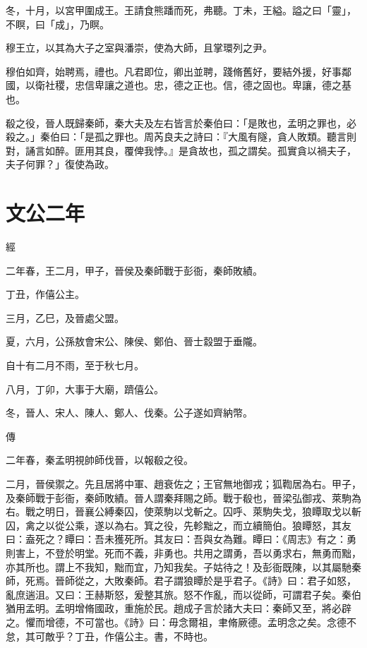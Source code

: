 \documentclass[fontset = none]{ctexart}
\begin{document}
冬，十月，以宮甲圍成王。王請食熊蹯而死，弗聽。丁未，王縊。謚之曰「靈」，不瞑，曰「成」，乃瞑。

穆王立，以其為大子之室與潘崇，使為大師，且掌環列之尹。

穆伯如齊，始聘焉，禮也。凡君即位，卿出並聘，踐脩舊好，要結外援，好事鄰國，以衛社稷，忠信卑讓之道也。忠，德之正也。信，德之固也。卑讓，德之基也。

殽之役，晉人既歸秦師，秦大夫及左右皆言於秦伯曰：「是敗也，孟明之罪也，必殺之。」秦伯曰：「是孤之罪也。周芮良夫之詩曰：『大風有隧，貪人敗類。聽言則對，誦言如醉。匪用其良，覆俾我悖。』是貪故也，孤之謂矣。孤實貪以禍夫子，夫子何罪？」復使為政。





\section{文公二年}


經



二年春，王二月，甲子，晉侯及秦師戰于彭衙，秦師敗績。

丁丑，作僖公主。

三月，乙巳，及晉處父盟。

夏，六月，公孫敖會宋公、陳侯、鄭伯、晉士縠盟于垂隴。

自十有二月不雨，至于秋七月。

八月，丁卯，大事于大廟，躋僖公。

冬，晉人、宋人、陳人、鄭人、伐秦。公子遂如齊納幣。

傳



二年春，秦孟明視帥師伐晉，以報殽之役。

二月，晉侯禦之。先且居將中軍、趙衰佐之；王官無地御戎；狐鞫居為右。甲子，及秦師戰于彭衙，秦師敗績。晉人謂秦拜賜之師。戰于殽也，晉梁弘御戎、萊駒為右。戰之明日，晉襄公縛秦囚，使萊駒以戈斬之。囚呼、萊駒失戈，狼瞫取戈以斬囚，禽之以從公乘，遂以為右。箕之役，先軫黜之，而立續簡伯。狼瞫怒，其友曰：盍死之？瞫曰：吾未獲死所。其友曰：吾與女為難。瞫曰：《周志》有之：勇則害上，不登於明堂。死而不義，非勇也。共用之謂勇，吾以勇求右，無勇而黜，亦其所也。謂上不我知，黜而宜，乃知我矣。子姑待之！及彭衙既陳，以其屬馳秦師，死焉。晉師從之，大敗秦師。君子謂狼瞫於是乎君子。《詩》曰：君子如怒，亂庶遄沮。又曰：王赫斯怒，爰整其旅。怒不作亂，而以從師，可謂君子矣。秦伯猶用孟明。孟明增脩國政，重施於民。趙成子言於諸大夫曰：秦師又至，將必辟之。懼而增德，不可當也。《詩》曰：毋念爾祖，聿脩厥德。孟明念之矣。念德不怠，其可敵乎？丁丑，作僖公主。書，不時也。
\end{document}
